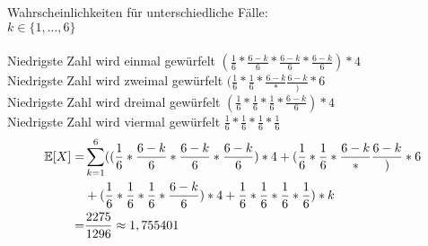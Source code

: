 Wahrscheinlichkeiten für unterschiedliche Fälle:
 \\
$k \in \{1, ..., 6\}$ \\
 \\
\newcommand{\one}{(\frac{1}{6} * \frac{6-k}{6} * \frac{6-k}{6} * \frac{6-k}{6}) * 4}
Niedrigste Zahl wird einmal gewürfelt $\one$ \\
\newcommand{\two}{(\frac{1}{6} * \frac{1}{6} * \frac{6-k} * \frac{6-k}) * 6}
Niedrigste Zahl wird zweimal gewürfelt $\two$ \\
\newcommand{\three}{(\frac{1}{6} * \frac{1}{6} * \frac{1}{6} * \frac{6-k}{6}) * 4}
Niedrigste Zahl wird dreimal gewürfelt $\three$ \\
\newcommand{\four}{\frac{1}{6} * \frac{1}{6} * \frac{1}{6} * \frac{1}{6}}
Niedrigste Zahl wird viermal gewürfelt $\four$ \\

\begin{align*}
	\E[X] = & \sum_{k=1}^{6} (\one + \two \\
			& + \three + \four) * k \\
		= & \frac{2275}{1296} \approx 1,755401
\end{align*}